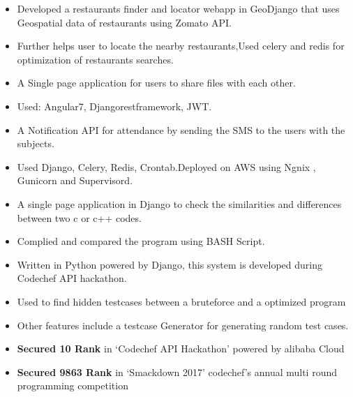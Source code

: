 \begin{itemize}
\item Developed a restaurants finder and locator webapp in GeoDjango that uses Geospatial data of restaurants using Zomato API.
\item Further helps user to locate the nearby restaurants,Used celery and redis for optimization of restaurants searches.
\end{itemize}
\smallskip
{}
\begin{itemize}
\item A Single page application for users to share files with each other.
\item Used: Angular7, Djangorestframework, JWT.
\end{itemize}
\smallskip
{}
\begin{itemize}
\item  A Notification API for attendance by sending the SMS to the users with the subjects. 
\item Used Django, Celery, Redis, Crontab.Deployed on AWS using Ngnix , Gunicorn and Supervisord.
\end{itemize}
\smallskip
{}
\begin{itemize}
\item A single page application in Django to check the similarities and differences between two c or c++ codes. 
\item Complied and compared the program using BASH Script.
\end{itemize}
\smallskip
{}
\begin{itemize}
\item Written in Python powered by Django, this system is developed during Codechef API hackathon.
\item Used to find hidden testcases between a bruteforce and a optimized program
\item Other features include a testcase Generator for generating random test cases.
\end{itemize}
{}

\begin{itemize}
    \item \textbf{Secured 10 Rank} in ‘Codechef API Hackathon' powered by alibaba Cloud
    \item \textbf{Secured 9863 Rank} in ‘Smackdown 2017' codechef's annual multi round programming competition
\end{itemize}